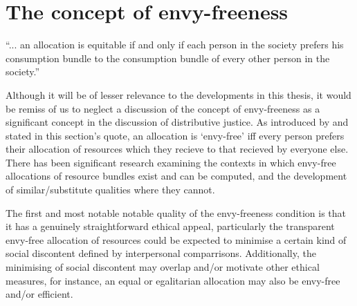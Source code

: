 \section{The concept of envy-freeness}

\begin{displayquote}
``... an allocation is equitable if and only if each person in the society prefers his consumption bundle to the consumption bundle of every other person in the society.'' \cite[Chapter 4]{foley_thesis}
\end{displayquote}

Although it will be of lesser relevance to the developments in this thesis, it would be remiss of us to neglect a discussion of the concept of envy-freeness as a significant concept in the discussion of distributive justice.
As introduced by \cite{foley_thesis} and stated in this section's quote, an allocation is `envy-free' iff every person prefers their allocation of resources which they recieve to that recieved by everyone else.
There has been significant research examining the contexts in which envy-free allocations of resource bundles exist and can be computed, and the development of similar/substitute qualities where they cannot.

The first and most notable notable quality of the envy-freeness condition is that it has a genuinely straightforward ethical appeal, particularly the transparent envy-free allocation of resources could be expected to minimise a certain kind of social discontent defined by interpersonal comparrisons.
Additionally, the minimising of social discontent may overlap and/or motivate other ethical measures, for instance, an equal or egalitarian allocation may also be envy-free and/or efficient.


